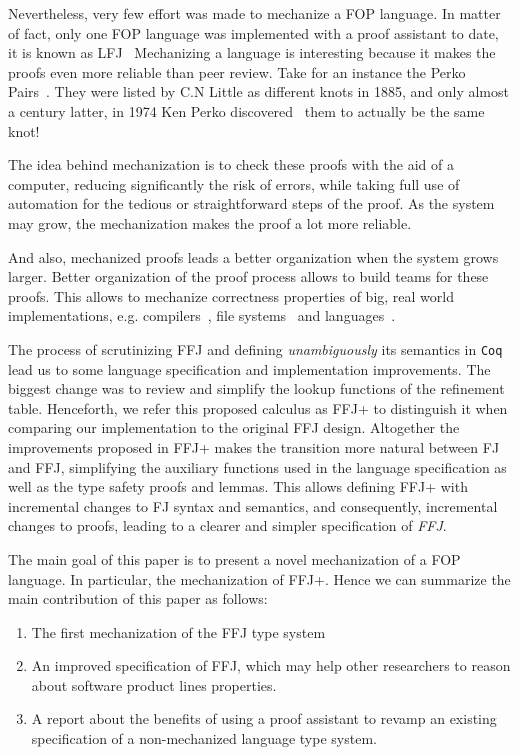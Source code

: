 Nevertheless, very few effort was made to mechanize a \gls{FOP} language. In matter of fact, only one
\gls{FOP} language was implemented with a proof assistant to date, it is known as LFJ~\cite{delaware2009machine}
Mechanizing a language is interesting because it makes the proofs even more reliable than peer review.
Take for an instance the Perko Pairs~\cite{little1900xxx}. 
They were listed by C.N Little as different knots in 1885, and only almost a century latter, 
in 1974 Ken Perko discovered~\cite{rolfsen1976knots} them to actually be the same knot!

The idea behind mechanization is to check these proofs with the aid of a computer, reducing significantly the risk of errors, while 
taking full use of automation for the tedious or straightforward steps of the proof. As the system may grow, the mechanization makes
the proof a lot more reliable.

And also, mechanized proofs leads a better organization when the system grows larger.
Better organization of the proof process allows to build teams for these proofs. 
This allows to mechanize correctness properties of big, real world implementations, e.g. compilers~\cite{leroy2012compcert}, 
file systems~\cite{arkoudas2004verifying, amani2015specifying} and languages~\cite{hartel2000formalising, klein2006machine}. 

The process of scrutinizing \gls{FFJ} and defining \textit{unambiguously} its semantics in \texttt{Coq} 
lead us to some language specification and implementation improvements. The biggest change was to review and
simplify the lookup functions of the refinement table.
Henceforth, we refer this proposed calculus as \gls{FFJ+} to distinguish it when comparing our implementation to the original \gls{FFJ} design.
Altogether the improvements proposed in \gls{FFJ+} makes the transition more natural between \gls{FJ} and \gls{FFJ}, 
simplifying the auxiliary functions used in the language specification as well as the type safety proofs and lemmas. 
This allows defining \gls{FFJ+} with incremental changes to \gls{FJ} syntax and semantics, 
and consequently, incremental changes to proofs, leading to a clearer and simpler specification of \textit{FFJ}.


The main goal of this paper is to present a novel mechanization of a \gls{FOP} language. In particular, the mechanization of \gls{FFJ+}.
Hence we can summarize the main contribution of this paper as follows:
\begin{enumerate}
    \item The first mechanization of the \gls{FFJ} type system
    \item An improved specification of \gls{FFJ}, which may help other researchers to reason about software product lines properties.
    \item A report about the benefits of using a proof assistant to revamp an existing specification of a non-mechanized language type system.
\end{enumerate}

